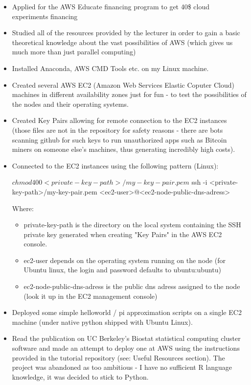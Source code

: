 \documentclass{customization}
\begin{document}
\begin{itemize}
    \item Applied for the AWS Educate financing program to get 40\$ cloud experiments financing
    \item Studied all of the resources provided by the lecturer in order to gain a basic theoretical knowledge about the vast possibilities of AWS (which gives us much more than just parallel computing)
    \item Installed Anaconda, AWS CMD Tools etc. on my Linux machine.
    \item Created several AWS EC2 (Amazon Web Services Elastic Coputer Cloud) machines in different availability zones just for fun - to test the possibilities of the nodes and their operating systems.
    \item Created Key Pairs allowing for remote connection to the EC2 instances (those files are not in the repository for safety reasons - there are bots scanning github for such keys to run unauthorized apps such as Bitcoin miners on someone else's machines, thus generating incredibly high costs).
    \item Connected to the EC2 instances using the following pattern (Linux): 
    \begin{sexylisting}[colback=white]{}
$ chmod 400 <private-key-path>/my-key-pair.pem
$ ssh -i <private-key-path>/my-key-pair.pem 
    <ec2-user>@<ec2-node-public-dns-adress>
    \end{sexylisting}
    Where:
    \begin{itemize}
        \item private-key-path is the directory on the local system containing the SSH private key generated when creating "Key Pairs" in the AWS EC2 console.
        \item ec2-user depends on the operating system running on the node (for Ubuntu linux, the login and password defaults to ubuntu:ubuntu)
        \item ec2-node-public-dns-adress is the public dns adress assigned to the node (look it up in the EC2 management console)
    \end{itemize}
    \item Deployed some simple helloworld / pi approximation scripts on a single EC2 machine (under native python shipped with Ubuntu Linux).
    \item Read the publication on UC Berkeley's Biostat statistical computing cluster software and made an attempt to deploy one at AWS using the instructions provided in the tutorial repository (see: Useful Resources section). The project was abandoned as too ambitious - I have no sufficient R language knowledge, it was decided to stick to Python.

\end{itemize}
\end{document}
